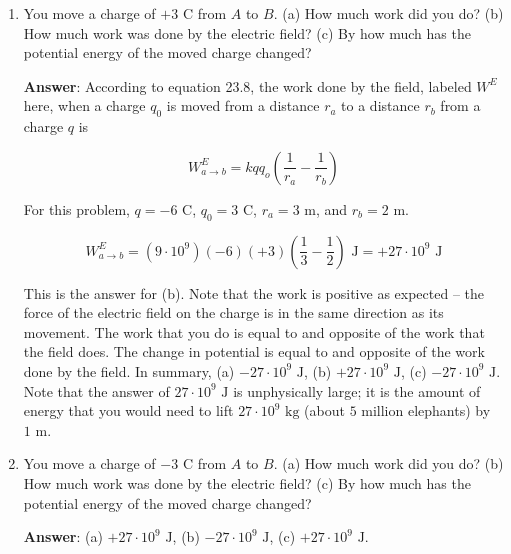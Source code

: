 \documentclass{article}
\begin{document}
\begin{enumerate}

  \item You move a charge of $+3\text{ C}$ from $A$ to $B$. (a) How much work did you do? (b) How much work was done by the electric field? (c) By how much has the potential energy of the moved charge changed?

     \ifsolutions
       {\bf Answer}: According to equation 23.8, the work done by the field, labeled $W^E$ here, when a charge $q_0$ is moved from a distance $r_a$ to a distance $r_b$ from a charge $q$ is

       \begin{equation}
     W^E_{a\rightarrow b} = kqq_o\left(\frac{1}{r_a}-\frac{1}{r_b}\right)
     \end{equation}

       For this problem, $q=-6\text{ C}$, $q_0=3\text{ C}$, $r_a=3\text{ m}$, and $r_b=2\text{ m}$.

       \begin{equation}
     W^E_{a\rightarrow b} = (9\cdot 10^9)(-6)(+3)\left(\frac{1}{3}-\frac{1}{2}\right)\text{ J} = +27\cdot 10^9\text{ J}
     \end{equation}

       This is the answer for (b). Note that the work is positive as expected -- the force of the electric field on the charge is in the same direction as its movement. The work that you do is equal to and opposite of the work that the field does. The change in potential is equal to and opposite of the work done by the field. In summary, (a) $-27\cdot 10^9\text{ J}$, (b) $+27\cdot 10^9\text{ J}$, (c) $-27\cdot 10^9\text{ J}$. Note that the answer of $27\cdot 10^9\text{ J}$ is unphysically large; it is the amount of energy that you would need to lift $27\cdot 10^9\text{ kg}$ (about $5$ million elephants) by $1\text{ m}$. 
     \else
       \vskip 48pt
     \fi
     \ifsolutions\else
     \vskip 48pt
     \fi

  \item You move a charge of $-3\text{ C}$ from $A$ to $B$. (a) How much work did you do? (b) How much work was done by the electric field? (c) By how much has the potential energy of the moved charge changed?

     \ifsolutions
       {\bf Answer}: (a) $+27\cdot 10^9\text{ J}$, (b) $-27\cdot 10^9\text{ J}$, (c) $+27\cdot 10^9\text{ J}$. 
     \else
       \vskip 48pt
     \fi
     \ifsolutions\else
     \vskip 48pt
     \fi


\end{enumerate}
\end{document}
